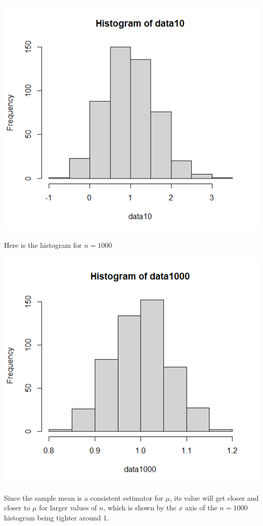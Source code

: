 \documentclass{article}
\begin{document}
\includegraphics*{data10.png}

Here is the histogram for $n=1000$

\includegraphics*{data1000.png}

Since the sample mean is a consistent estimator for $\mu$,
its value will get closer and closer to $\mu$ for larger values of $n$,
which is shown by the $x$ axis of the $n=1000$ histogram being tighter around 1.
\end{document}
